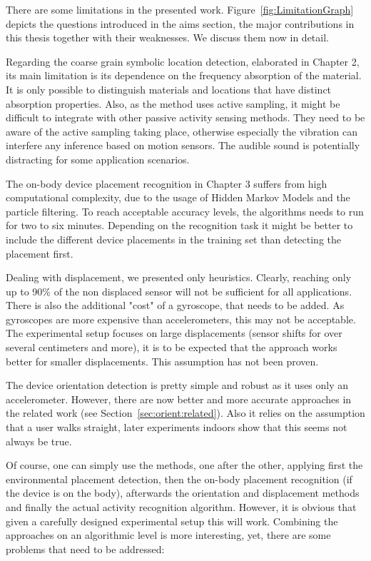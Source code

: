 There are some limitations in the presented work. 
Figure~\ref{fig:LimitationGraph} depicts the questions introduced in the aims section, the
major contributions in this thesis together with their weaknesses. We discuss them now in detail.

Regarding the coarse grain symbolic location detection, elaborated
in Chapter 2, its main limitation is its dependence on 
the frequency absorption of the material. It is only possible
 to distinguish materials and locations that have 
distinct absorption properties. Also, as the method
uses active sampling, it might be difficult
to integrate with other passive activity sensing methods.
They need to be aware of the active sampling taking place,
otherwise especially the vibration can interfere any inference
based on motion sensors. The audible sound is potentially distracting
for some application scenarios.

The on-body device placement recognition in Chapter 3
suffers from high computational complexity, due to the usage
of Hidden Markov Models and the particle filtering. To reach 
acceptable accuracy levels, the algorithms needs to run
for two to six minutes. Depending on the recognition task
it might be better to include the different device placements
in the training set than detecting the placement first.


Dealing with displacement, we presented only heuristics.
Clearly, reaching only up to 90\% of the non displaced sensor will not be
sufficient for all applications. There is also the additional
"cost" of a gyroscope, that needs to be added. As gyroscopes
are more expensive than accelerometers, this may not be acceptable.
The experimental setup focuses on large displacements (sensor
shifts for over several centimeters and more), it is to be
expected that the approach works better for smaller displacements.
This assumption has not been proven.

The device orientation detection is pretty simple and robust
as it uses only an accelerometer. However, there are now better
and more accurate approaches in the related work (see Section~\ref{sec:orient:related}).
Also it relies on the assumption that a user walks straight, 
later experiments indoors show that this seems not always be true.

Of course, one can simply use the methods, one after the other,
applying first the environmental placement detection, then
the on-body placement recognition (if the device is on the body),
 afterwards the orientation and displacement methods and finally
the actual activity recognition algorithm. However, it is obvious
that given a carefully designed experimental setup this will work.
Combining the approaches on an algorithmic level is more interesting,
yet, there are some problems that need to be addressed:

